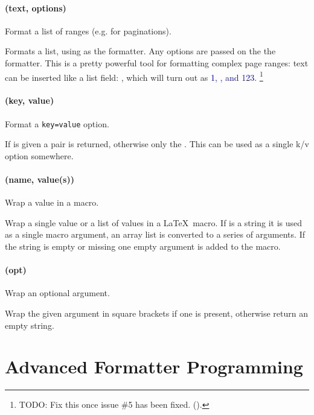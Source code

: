 \documentclass{scrartcl}
\begin{document}
\paragraph{ (text, options)}

Format a list of ranges (e.g. for paginations).

Formats a list, using  as the formatter.  Any options are passed
on the the  formatter.  This is a pretty powerful tool for
formatting complex page ranges: text can be inserted like a 
list field: \texttt{}, which will turn out as \textcolor{blue}{1, ,  and 123}.%
\footnote{TODO: Fix this once issue \#5 has been fixed. ().}


\paragraph{ (key, value)}

Format a \texttt{key=value} option.

If  is given a \value{key=value} pair is returned, otherwise only
the .  This can be used as a single k/v option somewhere.


\paragraph{ (name, value(s))}

Wrap a value in a macro.

Wrap a single value or a list of values in a \LaTeX\ macro. If  is
a string it is used as a single macro argument, an array list is converted to a
series of arguments. If the string is empty or missing one empty argument is
added to the macro.


\paragraph{ (opt)}

Wrap an optional argument.

Wrap the given argument in square brackets if one is present, otherwise return
an empty string.




\section{Advanced Formatter Programming}
\label{sec:advanced-programming}
\end{document}
